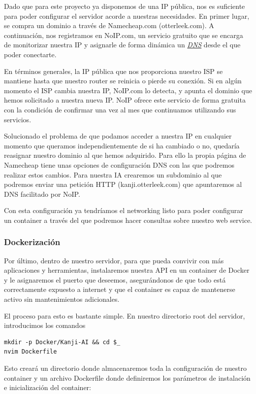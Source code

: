 \documentclass{article}
\begin{document}
Dado que para este proyecto ya disponemos de una IP pública, nos es suficiente para poder configurar el servidor acorde a nuestras necesidades. En primer lugar, se compra un dominio a través de Namecheap.com (otterleek.com). A continuación, nos registramos en NoIP.com, un servicio gratuito que se encarga de monitorizar nuestra IP y asignarle de forma dinámica un \hyperref[sec:terms]{\textit{DNS}\tec} desde el que poder conectarte.

En términos generales, la IP pública que nos proporciona nuestro ISP se mantiene hasta que nuestro router se reinicia o pierde su conexión. Si en algún momento el ISP cambia nuestra IP, NoIP.com lo detecta, y apunta el dominio que hemos solicitado a nuestra nueva IP. NoIP ofrece este servicio de forma gratuita con la condición de confirmar una vez al mes que continuamos utilizando sus servicios.

Solucionado el problema de que podamos acceder a nuestra IP en cualquier momento que queramos independientemente de si ha cambiado o no, quedaría reasignar nuestro dominio al que hemos adquirido. Para ello la propia página de Namecheap tiene unas opciones de configuración DNS con las que podremos realizar estos cambios. Para nuestra IA crearemos un subdominio al que podremos enviar una petición HTTP (kanji.otterleek.com) que apuntaremos al DNS facilitado por NoIP.

Con esta configuración ya tendríamos el networking listo para poder configurar un container a través del que podremos hacer consultas sobre nuestro web service.

\subsubsection{Dockerización}
Por último, dentro de nuestro servidor, para que pueda convivir con más aplicaciones y herramientas, instalaremos nuestra API en un container de Docker y le asignaremos el puerto que deseemos, asegurándonos de que todo está correctamente expuesto a internet y que el container es capaz de mantenerse activo sin mantenimientos adicionales.

\noindent El proceso para esto es bastante simple. En nuestro directorio root del servidor, introducimos los comandos

\noindent\begin{minipage}{\textwidth}
\begin{lstlisting}[numbers=none]
mkdir -p Docker/Kanji-AI && cd $_
nvim Dockerfile
\end{lstlisting}
\end{minipage}
Esto creará un directorio donde almacenaremos toda la configuración de nuestro container y un archivo Dockerfile donde definiremos los parámetros de instalación e inicialización del container:
\end{document}
